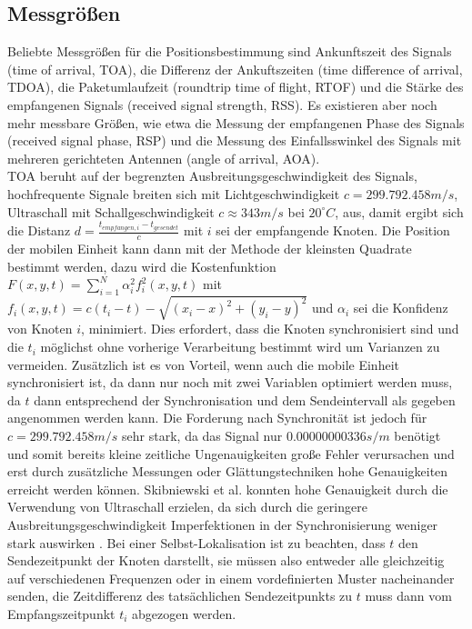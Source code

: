 \subsection{Messgrößen}
Beliebte Messgrößen für die Positionsbestimmung sind Ankunftszeit des Signals (time of arrival, TOA), die Differenz der Ankuftszeiten (time difference of arrival, TDOA), die Paketumlaufzeit (roundtrip time of flight, RTOF) und die Stärke des empfangenen Signals (received signal strength, RSS). Es existieren aber noch mehr messbare Größen, wie etwa die Messung der empfangenen Phase des Signals (received signal phase, RSP) und die Messung des Einfallsswinkel des Signals mit mehreren gerichteten Antennen (angle of arrival, AOA). \\
TOA beruht auf der begrenzten Ausbreitungsgeschwindigkeit des Signals, hochfrequente Signale breiten sich mit Lichtgeschwindigkeit $c = 299.792.458m/s$, Ultraschall mit Schallgeschwindigkeit $c \approx 343m/s$ bei $20^{\circ}C$, aus, damit ergibt sich die Distanz $d = \frac{t_{empfangen,i} - t_{gesendet}}{c}$ mit $i$ sei der empfangende Knoten. Die Position der mobilen Einheit kann dann mit der Methode der kleinsten Quadrate bestimmt werden, dazu wird die Kostenfunktion $F(x,y,t) = \sum_{i=1}^{N} {\alpha}^2_i f^2_i(x,y,t)$ mit $f_i(x,y,t) = c(t_i - t) - \sqrt{(x_i - x)^2 + (y_i - y)^2}$ und ${\alpha}_i$ sei die Konfidenz von Knoten $i$, minimiert. Dies erfordert, dass die Knoten synchronisiert sind und die $t_i$ möglichst ohne vorherige Verarbeitung bestimmt wird um Varianzen zu vermeiden. Zusätzlich ist es von Vorteil, wenn auch die mobile Einheit synchronisiert ist, da dann nur noch mit zwei Variablen optimiert werden muss, da $t$ dann entsprechend der Synchronisation und dem Sendeintervall als gegeben angenommen werden kann. Die Forderung nach Synchronität ist jedoch für $c = 299.792.458m/s$ sehr stark, da das Signal nur $0.00000000336 s/m$ benötigt und somit bereits kleine zeitliche Ungenauigkeiten große Fehler verursachen und erst durch zusätzliche Messungen oder Glättungstechniken hohe Genauigkeiten erreicht werden können. Skibniewski et al. konnten hohe Genauigkeit durch die Verwendung von Ultraschall erzielen, da sich durch die geringere Ausbreitungsgeschwindigkeit Imperfektionen in der Synchronisierung weniger stark auswirken \cite{skibniewski2009simulation}. 
Bei einer Selbst-Lokalisation ist zu beachten, dass $t$ den Sendezeitpunkt der Knoten darstellt, sie müssen also entweder alle gleichzeitig auf verschiedenen Frequenzen oder in einem vordefinierten Muster nacheinander senden, die Zeitdifferenz des tatsächlichen Sendezeitpunkts zu $t$ muss dann vom Empfangszeitpunkt $t_i$ abgezogen werden. \\
